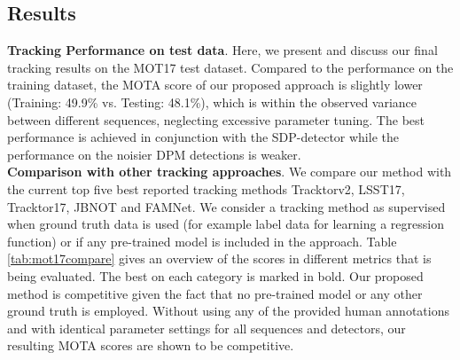 \subsection{Results}
\label{subsec:mot17benchark}

\noindent\textbf{Tracking Performance on test data}. 
Here, we present and discuss our final tracking results on the MOT17 test dataset. 
Compared to the performance on the training dataset, the MOTA score of our proposed approach is slightly lower (Training: 49.9\% vs. Testing: 48.1\%), which is within the observed variance between different sequences, neglecting excessive parameter tuning.
The best performance is achieved in conjunction with the SDP-detector while the performance on the noisier DPM detections is weaker.\\

\noindent\textbf{Comparison with other tracking approaches}. 
We compare our method with the current top five best reported tracking methods Tracktorv2\cite{bergmann2019tracking}, LSST17\cite{feng2019multi}, Tracktor17\cite{bergmann2019tracking}, JBNOT\cite{henschel2019multiple} and FAMNet\cite{chu2019famnet}.
We consider a tracking method as supervised when ground truth data is used (for example label data for learning a regression function) or if any pre-trained model is included in the approach.
Table \ref{tab:mot17compare} gives an overview of the scores in different metrics that is being evaluated. 
The best on each category is marked in bold. 
Our proposed method is competitive given the fact that no pre-trained model or any other ground truth is employed. 
Without using any of the provided human annotations and with identical parameter settings for all sequences and detectors, our resulting MOTA scores are shown to be competitive.\\



